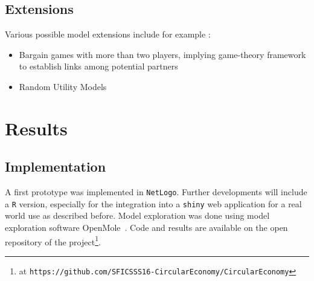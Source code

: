 \documentclass[fleqn,10pt]{wlscirep}
\begin{document}
{%
\subsection{Extensions}

Various possible model extensions include for example :
\begin{itemize}
\item Bargain games with more than two players, implying game-theory framework to establish links among potential partners
\item Random Utility Models
\end{itemize}















\section{Results}






\subsection{Implementation}

A first prototype was implemented in \texttt{NetLogo}. Further developments will include a \texttt{R} version, especially for the integration into a \texttt{shiny} web application for a real world use as described before. Model exploration was done using model exploration software OpenMole~\cite{reuillon2013openmole}. Code and results are available on the open repository of the project\footnote{at \texttt{https://github.com/SFICSSS16-CircularEconomy/CircularEconomy}}.


}
\end{document}
